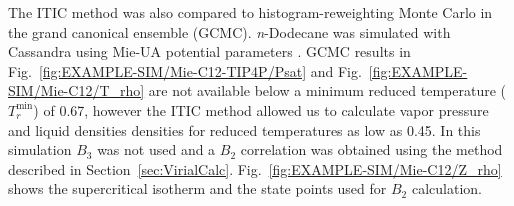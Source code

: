\documentclass[5p,times]{elsarticle}
\begin{document}



The ITIC method was also compared to histogram-reweighting Monte Carlo in the grand canonical ensemble (GCMC). \textit{n}-Dodecane was simulated with Cassandra using Mie-UA potential parameters \cite{Potoff2009}. GCMC results in Fig.~\ref{fig:EXAMPLE-SIM/Mie-C12-TIP4P/Psat} and Fig.~\ref{fig:EXAMPLE-SIM/Mie-C12/T_rho} are not available below a minimum reduced temperature ($T_r^{\mathrm{min}}$) of 0.67, however the ITIC method allowed us to calculate vapor pressure and liquid densities densities for reduced temperatures as low as 0.45. In this simulation $B_3$ was not used and a $B_2$ correlation was obtained using the method described in Section~\ref{sec:VirialCalc}. Fig.~\ref{fig:EXAMPLE-SIM/Mie-C12/Z_rho} shows the supercritical isotherm and the state points used for $B_2$ calculation.

\end{document}
